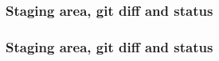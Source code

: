 \documentclass{beamer}
\begin{document}
    \begin{frame}
        \frametitle{Staging area, git diff and status}
        \begin{figure}[H]
            \centering
            \noindent
            \label{fig:figure7}
        \end{figure}
    \end{frame}
    \begin{frame}
        \frametitle{Staging area, git diff and status}
        \begin{figure}[H]
            \centering
            \noindent
        \end{figure}
    \end{frame}
\end{document}
